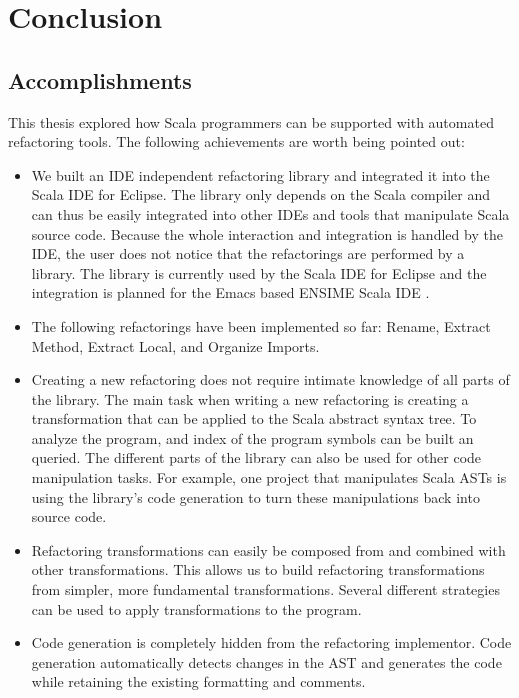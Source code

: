 \documentclass[10pt,a4paper,oneside]{scrreprt}
\begin{document}
\chapter{Conclusion} \label{chapter:outlook}


\section{Accomplishments}

This thesis explored how Scala programmers can be supported with automated refactoring tools. The following achievements are worth being pointed out: 

\begin{itemize}
  \item We built an IDE independent refactoring library and integrated it into the Scala IDE for Eclipse. The library only depends on the Scala compiler and can thus be easily integrated into other IDEs and tools that manipulate Scala source code. Because the whole interaction and integration is handled by the IDE, the user does not notice that the refactorings are performed by a library. The library is currently used by the Scala IDE for Eclipse \cite{EclipseScalaIDE} and the integration is planned for the Emacs based ENSIME Scala IDE \cite{Ensime}.

  \item The following refactorings have been implemented so far: Rename, Extract Method, Extract Local, and Organize Imports.

  \item Creating a new refactoring does not require intimate knowledge of all parts of the library. The main task when writing a new refactoring is creating a transformation that can be applied to the Scala abstract syntax tree. To analyze the program, and index of the program symbols can be built an queried. The different parts of the library can also be used for other code manipulation tasks. For example, one project \cite{RichardEmberson} that manipulates Scala ASTs  is using the library's code generation to turn these manipulations back into source code.

  \item Refactoring transformations can easily be composed from and combined with other transformations. This allows us to build refactoring transformations from simpler, more fundamental transformations. Several different strategies can be used to apply transformations to the program.

  \item Code generation is completely hidden from the refactoring implementor. Code generation automatically detects changes in the AST and generates the code while retaining the existing formatting and comments.

\end{itemize}
\end{document}
